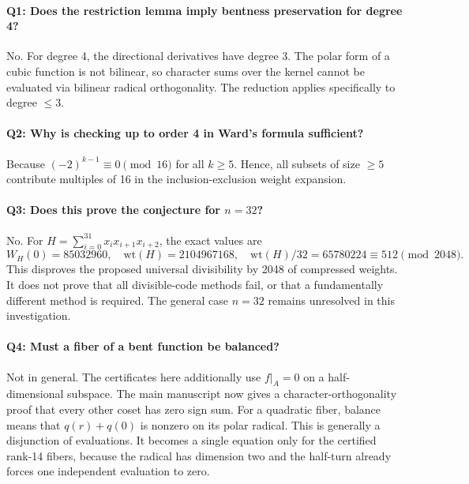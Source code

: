 \documentclass[11pt,a4paper]{article}
\theoremstyle{definition}
\newcommand{\wt}{\mathrm{wt}}
\begin{document}
\paragraph{Q1: Does the restriction lemma imply bentness preservation for degree 4?}
No. For degree 4, the directional derivatives have degree 3. The polar form of a cubic function is not bilinear, so character sums over the kernel cannot be evaluated via bilinear radical orthogonality. The reduction applies specifically to degree $\le 3$.

\paragraph{Q2: Why is checking up to order 4 in Ward's formula sufficient?}
Because $(-2)^{k-1} \equiv 0 \pmod{16}$ for all $k \ge 5$. Hence, all subsets of size $\ge 5$ contribute multiples of 16 in the inclusion-exclusion weight expansion.

\paragraph{Q3: Does this prove the conjecture for $n = 32$?}
No. For $H=\sum_{i=0}^{31}x_ix_{i+1}x_{i+2}$, the exact values are
\[
 W_H(0)=85032960,\quad \wt(H)=2104967168,\quad
 \wt(H)/32=65780224\equiv512\pmod{2048}.
\]
This disproves the proposed universal divisibility by 2048 of compressed weights. It does not prove that all divisible-code methods fail, or that a fundamentally different method is required. The general case $n=32$ remains unresolved in this investigation.

\paragraph{Q4: Must a fiber of a bent function be balanced?}
Not in general. The certificates here additionally use $f|_A=0$ on a half-dimensional subspace. The main manuscript now gives a character-orthogonality proof that every other coset has zero sign sum. For a quadratic fiber, balance means that $q(r)+q(0)$ is nonzero on its polar radical. This is generally a disjunction of evaluations. It becomes a single equation only for the certified rank-14 fibers, because the radical has dimension two and the half-turn already forces one independent evaluation to zero.
\end{document}
